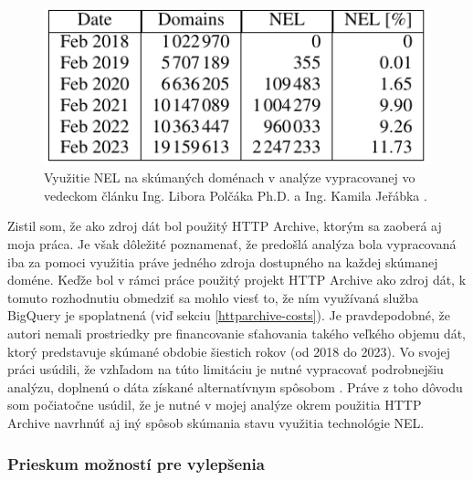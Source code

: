 \begin{figure}[!htb]
\begin{center}
    \includegraphics[width=0.55\linewidth]{obrazky-figures/polcak-analysis-hd.pdf}
    \caption{\centering Využitie NEL na skúmaných doménach v analýze vypracovanej vo vedeckom článku Ing. Libora Polčáka Ph.D. a Ing. Kamila Jeřábka \cite{nel-http-archive}.}
    \label{fig:polcak-analysis}
\end{center}
\end{figure}

\pagebreak

Zistil som, že ako zdroj dát bol použitý HTTP Archive, ktorým sa zaoberá aj moja práca.
Je však dôležité poznamenať, že predošlá analýza bola vypracovaná iba za pomoci využitia 
práve jedného zdroja dostupného na každej skúmanej doméne.
Keďže bol v rámci práce použitý projekt HTTP Archive ako zdroj dát, k tomuto rozhodnutiu obmedziť sa mohlo viesť to, 
že ním využívaná služba BigQuery je spoplatnená (viď sekciu \ref{httparchive-costs}). 
Je pravdepodobné, že autori nemali prostriedky pre financovanie sťahovania takého veľkého objemu dát, 
ktorý predstavuje skúmané obdobie šiestich rokov (od 2018 do 2023).
Vo svojej práci usúdili, že vzhľadom na túto limitáciu je nutné vypracovať podrobnejšiu analýzu, 
doplnenú o dáta získané alternatívnym spôsobom \cite{nel-http-archive}.
Práve z toho dôvodu som počiatočne usúdil, že je nutné v mojej analýze okrem použitia HTTP Archive navrhnúť 
aj iný spôsob skúmania stavu využitia technológie NEL.

\subsubsection{Prieskum možností pre vylepšenia}

